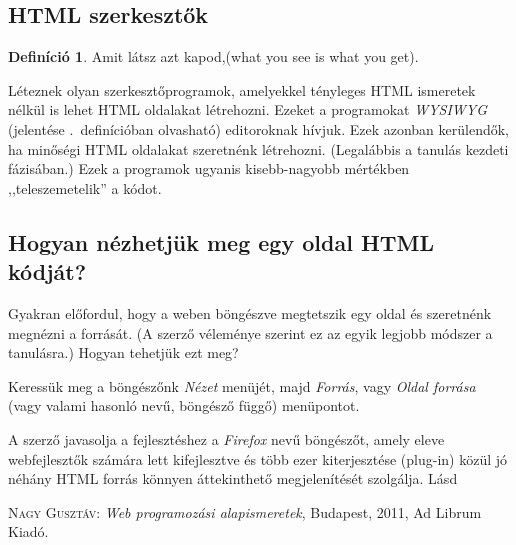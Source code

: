 \documentclass{thesis-ekf}
\theoremstyle{definition}
\newtheorem{definicio}{Definíció}[chapter]
\begin{document}
\subsection{HTML szerkesztők}
\begin{definicio}\label{definicio:WYSIWYG}
	Amit látsz azt kapod,(what you see is what you get).
\end{definicio}
Léteznek olyan szerkesztőprogramok, amelyekkel tényleges HTML ismeretek nélkül is lehet HTML oldalakat létrehozni. Ezeket a programokat \emph{WYSIWYG} (jelentése \az{\ref{definicio:WYSIWYG}}.~definícióban olvasható) editoroknak hívjuk. Ezek azonban kerülendők, ha minőségi HTML oldalakat szeretnénk létrehozni. (Legalábbis a tanulás kezdeti fázisában.) Ezek a programok ugyanis kisebb-nagyobb mértékben ,,teleszemetelik'' a kódot.
\subsection{Hogyan nézhetjük meg egy oldal HTML kódját?}
Gyakran előfordul, hogy a weben böngészve megtetszik egy oldal és szeretnénk megnézni a forrását. (A szerző véleménye szerint ez az egyik legjobb módszer a tanulásra.) Hogyan tehetjük ezt meg?

Keressük meg a böngészőnk \emph{Nézet} menüjét, majd \emph{Forrás}, vagy \emph{Oldal forrása} (vagy valami hasonló nevű, böngésző függő) menüpontot.

A szerző javasolja a fejlesztéshez a \emph{Firefox} nevű böngészőt, amely eleve webfejlesztők számára lett kifejlesztve és több ezer kiterjesztése (plug-in) közül jó néhány HTML forrás könnyen áttekinthető megjelenítését szolgálja. Lásd \cite[33.~oldal]{NAGY}
	\begin{thebibliography}{1}
		 \textsc{Nagy Gusztáv}: \emph{Web programozási alapismeretek}, Budapest, 2011, Ad Librum Kiadó.
	\end{thebibliography}
\end{document}
